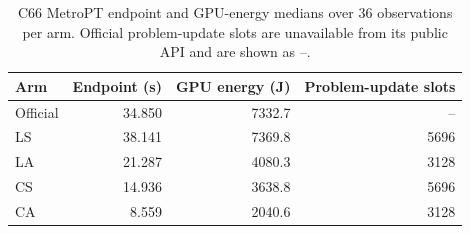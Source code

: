\begin{table}[t]\centering
\caption{C66 MetroPT endpoint and GPU-energy medians over 36 observations per arm. Official problem-update slots are unavailable from its public API and are shown as --.}
\label{tab:c66-metro-endpoint-energy}
\begin{tabular}{lrrr}\toprule
Arm & Endpoint (s) & GPU energy (J) & Problem-update slots \\\midrule
Official & 34.850 & 7332.7 & -- \\
LS & 38.141 & 7369.8 & 5696 \\
LA & 21.287 & 4080.3 & 3128 \\
CS & 14.936 & 3638.8 & 5696 \\
CA & 8.559 & 2040.6 & 3128 \\
\bottomrule
\end{tabular}
\end{table}
